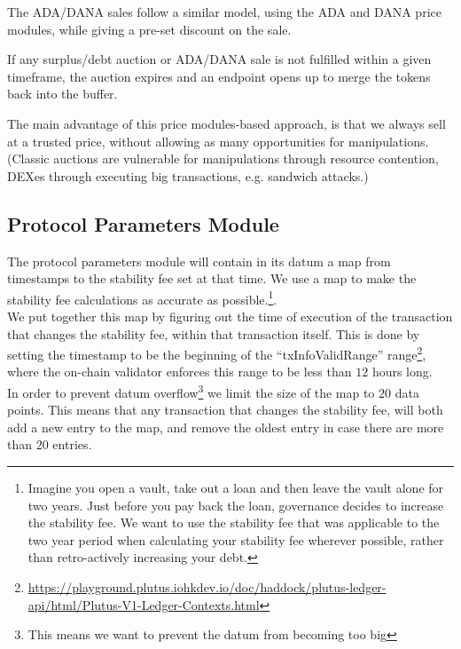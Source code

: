 \documentclass{article} %
\begin{document}
The ADA/DANA sales follow a similar model, using the ADA and DANA price modules,
while giving a pre-set discount on the sale.

If any surplus/debt auction or ADA/DANA sale is not fulfilled within a given
timeframe, the auction expires and an endpoint opens up to merge the tokens back
into the buffer.

The main advantage of this price modules-based approach, is that we always sell
at a trusted price, without allowing as many opportunities for manipulations.
(Classic auctions are vulnerable for manipulations through resource contention,
DEXes through executing big transactions, e.g. sandwich attacks.)
 
\subsection{Protocol Parameters Module}

The protocol parameters module will contain in its datum a map from timestamps to the stability fee
set at that time.
We use a map to make the stability fee calculations as accurate as
possible.\footnote{
  Imagine you open a vault, take out a loan and then leave the vault alone for
  two years.
  Just before you pay back the loan, governance decides to increase the
  stability fee.
  We want to use the stability fee that was applicable to the two year period
  when calculating your stability fee wherever possible, rather than
  retro-actively increasing your debt.
}. \\

We put together this map by figuring out the time of execution of the
transaction that changes the stability fee, within that transaction itself.
This is done by setting the timestamp to be the beginning of the
``txInfoValidRange'' range\footnote{
  \url{https://playground.plutus.iohkdev.io/doc/haddock/plutus-ledger-api/html/Plutus-V1-Ledger-Contexts.html}},
where the on-chain validator enforces this range to be less than $12$ hours
long. \\

In order to prevent datum overflow\footnote{
  This means we want to prevent the datum from becoming too big}
we limit the size of the map to $20$ data points.
This means that any transaction that changes the stability fee, will both add a
new entry to the map, and remove the oldest entry in case there are more than
$20$ entries. \\
\end{document}

